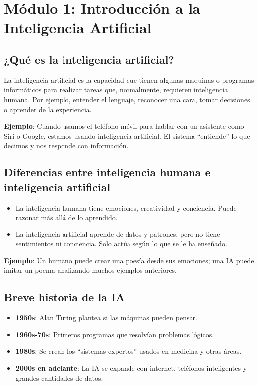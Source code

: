 \documentclass[12pt]{article}
\begin{document}
	\section{\textbf{\normalsize Módulo 1: Introducción a la Inteligencia Artificial}}
	
	\subsection*{¿Qué es la inteligencia artificial?}
	La inteligencia artificial es la capacidad que tienen algunas máquinas o programas informáticos para realizar tareas que, normalmente, requieren inteligencia humana. Por ejemplo, entender el lenguaje, reconocer una cara, tomar decisiones o aprender de la experiencia.
	
	\textbf{Ejemplo}: Cuando usamos el teléfono móvil para hablar con un asistente como Siri o Google, estamos usando inteligencia artificial. El sistema “entiende” lo que decimos y nos responde con información.
	
	\subsection*{Diferencias entre inteligencia humana e inteligencia artificial}
	\begin{itemize}
		\item La inteligencia humana tiene emociones, creatividad y conciencia. Puede razonar más allá de lo aprendido.
		\item La inteligencia artificial aprende de datos y patrones, pero no tiene sentimientos ni conciencia. Solo actúa según lo que se le ha enseñado.
	\end{itemize}
	
	\textbf{Ejemplo}: Un humano puede crear una poesía desde sus emociones; una IA puede imitar un poema analizando muchos ejemplos anteriores.
	
	\subsection*{Breve historia de la IA}
	\begin{itemize}
		\item \textbf{1950s}: Alan Turing plantea si las máquinas pueden pensar.
		\item \textbf{1960s-70s}: Primeros programas que resolvían problemas lógicos.
		\item \textbf{1980s}: Se crean los “sistemas expertos” usados en medicina y otras áreas.
		\item \textbf{2000s en adelante}: La IA se expande con internet, teléfonos inteligentes y grandes cantidades de datos.
	\end{itemize}
	
\end{document}

